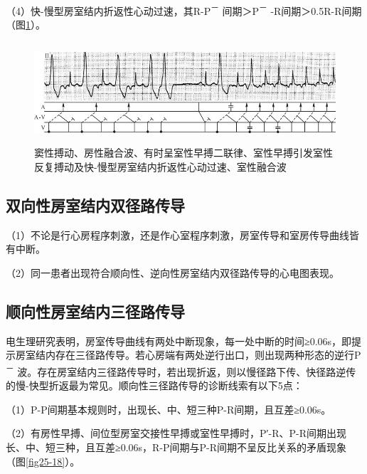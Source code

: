 （4）快-慢型房室结内折返性心动过速，其R-P\textsuperscript{－}
间期＞P\textsuperscript{－} -R间期＞0.5R-R间期（图\ref{fig25-17}）。

\begin{figure}[!htbp]
 \centering
 \includegraphics[width=5.48958in,height=1.47917in]{./images/Image00428.jpg}
 \captionsetup{justification=centering}
 \caption{窦性搏动、房性融合波、有时呈室性早搏二联律、室性早搏引发室性反复搏动及快-慢型房室结内折返性心动过速、室性融合波}
 \label{fig25-17}
  \end{figure} 

\protect\hypertarget{text00032.htmlux5cux23subid384}{}{}

\subsection{双向性房室结内双径路传导}

（1）不论是行心房程序刺激，还是作心室程序刺激，房室传导和室房传导曲线皆有中断。

（2）同一患者出现符合顺向性、逆向性房室结内双径路传导的心电图表现。

\protect\hypertarget{text00032.htmlux5cux23subid385}{}{}

\subsection{顺向性房室结内三径路传导}

电生理研究表明，房室传导曲线有两处中断现象，每一处中断的时间≥0.06s，即提示房室结内存在三径路传导。若心房端有两处逆行出口，则出现两种形态的逆行P\textsuperscript{－}
波。存在房室结内三径路传导时，若出现折返，则以慢径路下传、快径路逆传的慢-快型折返最为常见。顺向性三径路传导的诊断线索有以下5点：

（1）P-P间期基本规则时，出现长、中、短三种P-R间期，且互差≥0.06s。

（2）有房性早搏、间位型房室交接性早搏或室性早搏时，P′-R、P-R间期出现长、中、短三种，且互差≥0.06s，R-P间期与P-R间期不呈反比关系的矛盾现象（图\ref{fig25-18}）。

